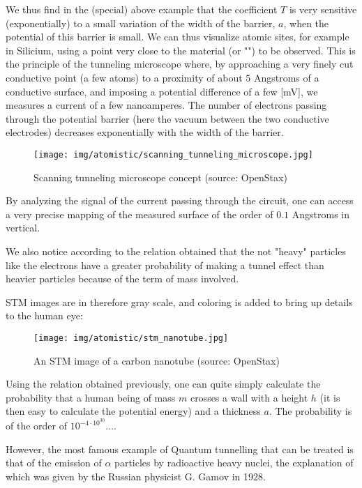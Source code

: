 	We thus find in the (special) above example that the coefficient $T$ is very sensitive (exponentially) to a small variation of the width of the barrier, $a$, when the potential of this barrier is small. We can thus visualize atomic sites, for example in Silicium, using a point very close to the material (or "") to be observed. This is the principle of the tunneling microscope where, by approaching a very finely cut conductive point (a few atoms) to a proximity of about $5$ Angstroms of a conductive surface, and imposing a potential difference of a few [mV], we measures a current of a few nanoamperes. The number of electrons passing through the potential barrier (here the vacuum between the two conductive electrodes) decreases exponentially with the width of the barrier.
	\begin{figure}[H]
		\centering
		\texttt{[image: img/atomistic/scanning\_tunneling\_microscope.jpg]}	
		\caption[Scanning tunneling microscope concept]{Scanning tunneling microscope concept (source: OpenStax)}
	\end{figure}
	By analyzing the signal of  the current passing through the circuit, one can access a very precise mapping of the measured surface of the order of $0.1$ Angstroms in vertical.
	
	We also notice according to the relation obtained that the not "heavy" particles like the electrons have a greater probability of making a tunnel effect than heavier particles because of the term of mass involved.
	
	STM images are in therefore gray scale, and coloring is added to bring up details to the human eye:
	\begin{figure}[H]
		\centering
		\texttt{[image: img/atomistic/stm\_nanotube.jpg]}	
		\caption[An STM image of a carbon nanotube]{An STM image of a carbon nanotube (source: OpenStax)}
	\end{figure}

	Using the relation obtained previously, one can quite simply calculate the probability that a human being of mass $m$ crosses a wall with a height $h$ (it is then easy to calculate the potential energy) and a thickness $a$. The probability is of the order of $10^{-4\cdot 10^{30}}$....

	However, the most famous example of Quantum tunnelling that can be treated is that of the emission of $\alpha$ particles by radioactive heavy nuclei, the explanation of which was given by the Russian physicist G. Gamov in 1928.


